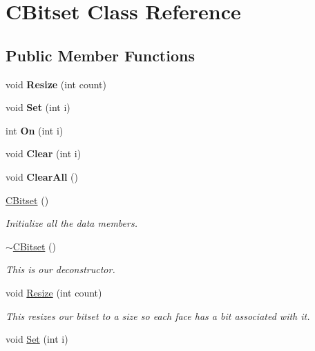 \hypertarget{class_c_bitset}{}\section{C\+Bitset Class Reference}
\label{class_c_bitset}
\subsection*{Public Member Functions}
\begin{DoxyCompactItemize}
\item 
void {\bfseries Resize} (int count)\hypertarget{class_c_bitset_a452780d0a5bf716012e7706929885a27}{}\label{class_c_bitset_a452780d0a5bf716012e7706929885a27}

\item 
void {\bfseries Set} (int i)\hypertarget{class_c_bitset_a217900efa644dd8d739a756d6811e475}{}\label{class_c_bitset_a217900efa644dd8d739a756d6811e475}

\item 
int {\bfseries On} (int i)\hypertarget{class_c_bitset_a57dfc60d4a180f8166e94bd41612d3f8}{}\label{class_c_bitset_a57dfc60d4a180f8166e94bd41612d3f8}

\item 
void {\bfseries Clear} (int i)\hypertarget{class_c_bitset_a0278f6027f4bbc3177731ccadb638e2a}{}\label{class_c_bitset_a0278f6027f4bbc3177731ccadb638e2a}

\item 
void {\bfseries Clear\+All} ()\hypertarget{class_c_bitset_ad1cf97399375c29574079338ce02d7ac}{}\label{class_c_bitset_ad1cf97399375c29574079338ce02d7ac}

\item 
\hyperlink{class_c_bitset_a20e9448086472dcf6cba08abf8a55f0a}{C\+Bitset} ()\hypertarget{class_c_bitset_a20e9448086472dcf6cba08abf8a55f0a}{}\label{class_c_bitset_a20e9448086472dcf6cba08abf8a55f0a}

\begin{DoxyCompactList}\small\item\em Initialize all the data members. \end{DoxyCompactList}\item 
\hyperlink{class_c_bitset_a9332c709c4d655959bcdac749db593b4}{$\sim$\+C\+Bitset} ()
\begin{DoxyCompactList}\small\item\em This is our deconstructor. \end{DoxyCompactList}\item 
void \hyperlink{class_c_bitset_a452780d0a5bf716012e7706929885a27}{Resize} (int count)
\begin{DoxyCompactList}\small\item\em This resizes our bitset to a size so each face has a bit associated with it. \end{DoxyCompactList}\item 
void \hyperlink{class_c_bitset_a217900efa644dd8d739a756d6811e475}{Set} (int i)\hypertarget{class_c_bitset_a217900efa644dd8d739a756d6811e475}{}\label{class_c_bitset_a217900efa644dd8d739a756d6811e475}


\end{DoxyCompactItemize}
